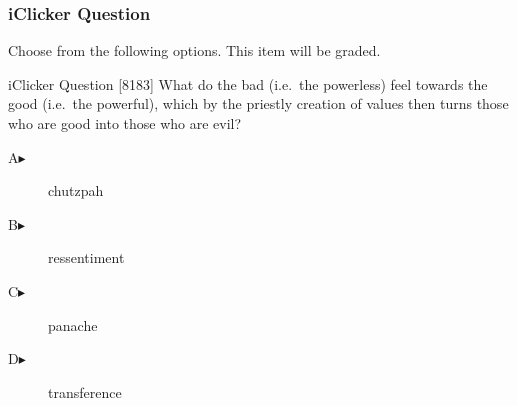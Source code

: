 \begin{frame}
  \frametitle{iClicker Question}
Choose from the following options. This item will be graded.
\begin{block}{iClicker Question}
[8183] What do the bad (i.e.\ the powerless) feel towards the good (i.e.\ the powerful), which by the priestly creation of values then turns those who are good into those who are evil?
\end{block}
\begin{description}
\item[A\hspace{.2in}$\blacktriangleright$] chutzpah
\item[B\hspace{.2in}$\blacktriangleright$] ressentiment
\item[C\hspace{.2in}$\blacktriangleright$] panache
\item[D\hspace{.2in}$\blacktriangleright$] transference
\end{description}
\end{frame}